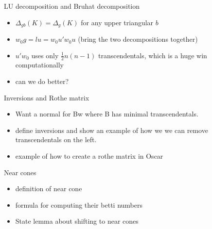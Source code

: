 \documentclass[9pt]{beamer}
\theoremstyle{definition}
\begin{document}
\begin{frame}[fragile]{LU decomposition and Bruhat decomposition }
  \begin{itemize}
  \item $\Delta_{gb}(K) = \Delta_g(K)$ for any upper triangular $b$
  \item $w_0g = lu = w_0u'w_0u$ (bring the two decompositions together)
  \item $u'w_0$ uses only $\frac{1}{2}n(n-1)$ transcendentals, which is a huge win computationally
  \item can we do better?
  \end{itemize}
\end{frame}


\begin{frame}[fragile]{Inversions and Rothe matrix}
  \begin{itemize}
  \item Want a normal for Bw where B has minimal transcendentals.
  \item define inversions and show an example of how we we can remove transcendentals on the left.
  \item example of how to create a rothe matrix in Oscar
  \end{itemize}
\end{frame}



\begin{frame}[fragile]{ Near cones}
  \begin{itemize}
  \item definition of near cone
  \item formula for computing their betti numbers
  \item State lemma about shifting to near cones
  \end{itemize}
\end{frame}

\end{document}
